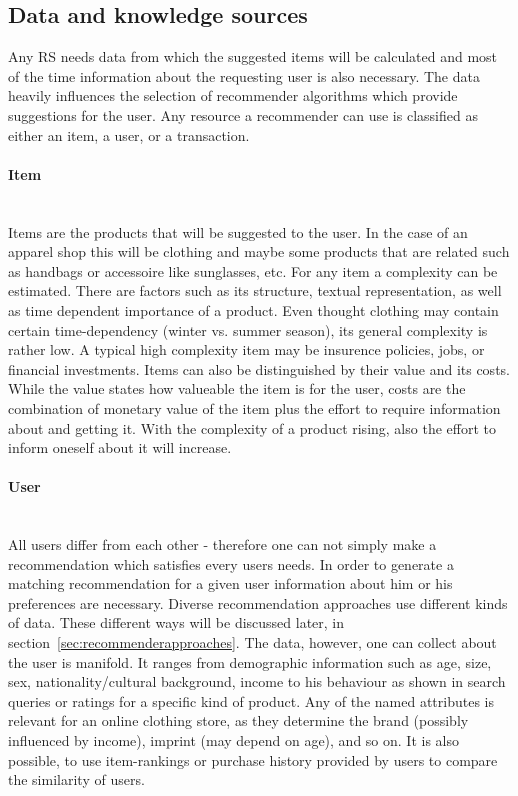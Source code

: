 \subsection{Data and knowledge sources}
\label{sec:dataknowledgesource}
Any RS needs data from which the suggested items will be calculated and most of the time information about the requesting user is also necessary.
The data heavily influences the selection of recommender algorithms which provide suggestions for the user.\citep[p.~7-8]{ricci:2011}
Any resource a recommender can use is classified as either an item, a user, or a transaction.

\paragraph{Item}~\\
Items are the products that will be suggested to the user.
In the case of an apparel shop this will be clothing and maybe some products that are related such as handbags or accessoire like sunglasses, etc.
For any item a complexity can be estimated.
There are factors such as its structure, textual representation, as well as time dependent importance of a product.
Even thought clothing may contain certain time-dependency (winter vs. summer season), its general complexity is rather low.
A typical high complexity item may be insurence policies, jobs, or financial investments.
Items can also be distinguished by their value and its costs.
While the value states how valueable the item is for the user, costs are the combination of monetary value of the item plus the effort to require information about and getting it.
With the complexity of a product rising, also the effort to inform oneself about it will increase.
\citep[p.~8]{ricci:2011}

\paragraph{User}~\\
All users differ from each other - therefore one can not simply make a recommendation which satisfies every users needs.
In order to generate a matching recommendation for a given user information about him or his preferences are necessary.
Diverse recommendation approaches use different kinds of data.
These different ways will be discussed later, in section~\ref{sec:recommenderapproaches}.
The data, however, one can collect about the user is manifold.
It ranges from demographic information such as age, size, sex, nationality/cultural background, income to his behaviour as shown in search queries or ratings for a specific kind of product.
Any of the named attributes is relevant for an online clothing store, as they determine the brand (possibly influenced by income), imprint (may depend on age), and so on.\citep[p.8-9]{ricci:2011}
It is also possible, to use item-rankings or purchase history provided by users to compare the similarity of users.\citep[p.~377-378]{pradel:2011}

